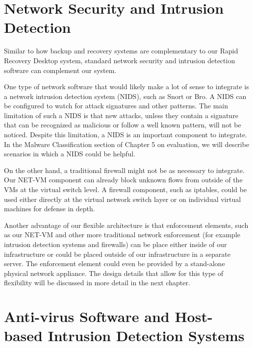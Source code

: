 \section{Network Security and Intrusion Detection}

Similar to how backup and recovery systems are complementary to our Rapid Recovery Desktop system, standard network security and intrusion detection software can complement our system.

One type of network software that would likely make a lot of sense to integrate is a network intrusion detection system (NIDS), such as Snort\cite{roesch_1999} or Bro\cite{paxson_1999}. A NIDS can be configured to watch for attack signatures and other patterns. The main limitation of such a NIDS is that new attacks, unless they contain a signature that can be recognized as malicious or follow a well known pattern, will not be noticed. Despite this limitation, a NIDS is an important component to integrate. In the Malware Classification section of Chapter 5 on evaluation, we will describe scenarios in which a NIDS could be helpful.

On the other hand, a traditional firewall might not be as necessary to integrate. Our NET-VM component can already block unknown flows from outside of the VMs at the virtual switch level. A firewall component, such as iptables\cite{iptables_website}, could be used either directly at the virtual network switch layer or on individual virtual machines for defense in depth. 

Another advantage of our flexible architecture is that enforcement elements, such as our NET-VM and other more traditional network enforcement (for example intrusion detection systems and firewalls) can be place either inside of our infrastructure or could be placed outside of our infrastructure in a separate server. The enforcement element could even be provided by a stand-alone physical network appliance. The design details that allow for this type of flexibility will be discussed in more detail in the next chapter.

\section{Anti-virus Software and Host-based Intrusion Detection Systems}

